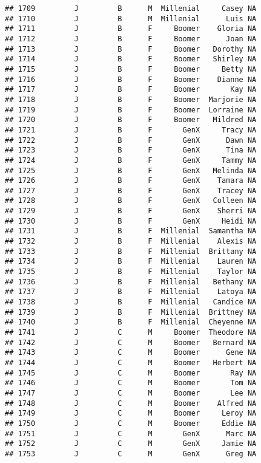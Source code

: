 \documentclass[
]{article}
\begin{document}
\begin{verbatim}
## 1709         J         B      M  Millenial     Casey NA
## 1710         J         B      M  Millenial      Luis NA
## 1711         J         B      F     Boomer    Gloria NA
## 1712         J         B      F     Boomer      Joan NA
## 1713         J         B      F     Boomer   Dorothy NA
## 1714         J         B      F     Boomer   Shirley NA
## 1715         J         B      F     Boomer     Betty NA
## 1716         J         B      F     Boomer    Dianne NA
## 1717         J         B      F     Boomer       Kay NA
## 1718         J         B      F     Boomer  Marjorie NA
## 1719         J         B      F     Boomer  Lorraine NA
## 1720         J         B      F     Boomer   Mildred NA
## 1721         J         B      F       GenX     Tracy NA
## 1722         J         B      F       GenX      Dawn NA
## 1723         J         B      F       GenX      Tina NA
## 1724         J         B      F       GenX     Tammy NA
## 1725         J         B      F       GenX   Melinda NA
## 1726         J         B      F       GenX    Tamara NA
## 1727         J         B      F       GenX    Tracey NA
## 1728         J         B      F       GenX   Colleen NA
## 1729         J         B      F       GenX    Sherri NA
## 1730         J         B      F       GenX     Heidi NA
## 1731         J         B      F  Millenial  Samantha NA
## 1732         J         B      F  Millenial    Alexis NA
## 1733         J         B      F  Millenial  Brittany NA
## 1734         J         B      F  Millenial    Lauren NA
## 1735         J         B      F  Millenial    Taylor NA
## 1736         J         B      F  Millenial   Bethany NA
## 1737         J         B      F  Millenial    Latoya NA
## 1738         J         B      F  Millenial   Candice NA
## 1739         J         B      F  Millenial  Brittney NA
## 1740         J         B      F  Millenial  Cheyenne NA
## 1741         J         C      M     Boomer  Theodore NA
## 1742         J         C      M     Boomer   Bernard NA
## 1743         J         C      M     Boomer      Gene NA
## 1744         J         C      M     Boomer   Herbert NA
## 1745         J         C      M     Boomer       Ray NA
## 1746         J         C      M     Boomer       Tom NA
## 1747         J         C      M     Boomer       Lee NA
## 1748         J         C      M     Boomer    Alfred NA
## 1749         J         C      M     Boomer     Leroy NA
## 1750         J         C      M     Boomer     Eddie NA
## 1751         J         C      M       GenX      Marc NA
## 1752         J         C      M       GenX     Jamie NA
## 1753         J         C      M       GenX      Greg NA

\end{verbatim}
\end{document}
